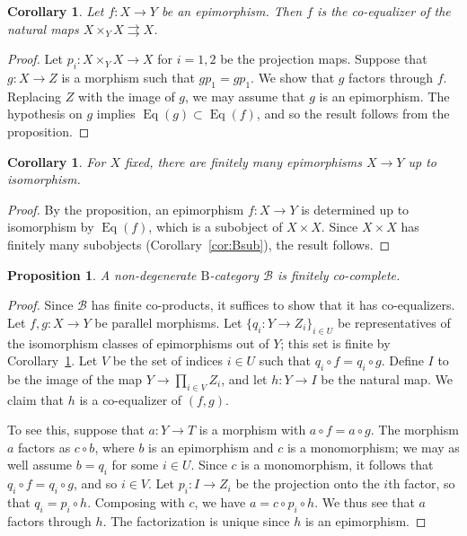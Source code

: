 \documentclass[12pt]{amsart}
\numberwithin{equation}{section}
\newtheorem{proposition}[equation]{Proposition}
\newtheorem{corollary}[equation]{Corollary}
\theoremstyle{definition}
\newcommand{\cB}{\mathcal{B}}
\newcommand{\rB}{\mathrm{B}}
\DeclareMathOperator{\Eq}{Eq}
\begin{document}
\begin{corollary} \label{cor:regular-epi}
Let $f \colon X \to Y$ be an epimorphism. Then $f$ is the co-equalizer of the natural maps $X \times_Y X \rightrightarrows X$.
\end{corollary}

\begin{proof}
Let $p_i \colon X \times_Y X \to X$ for $i=1,2$ be the projection maps. Suppose that $g \colon X \to Z$ is a morphism such that $gp_1=gp_1$. We show that $g$ factors through $f$. Replacing $Z$ with the image of $g$, we may assume that $g$ is an epimorphism. The hypothesis on $g$ implies $\Eq(g) \subset \Eq(f)$, and so the result follows from the proposition.
\end{proof}

\begin{corollary} \label{cor:finite-quot}
For $X$ fixed, there are finitely many epimorphisms $X \to Y$ up to isomorphism.
\end{corollary}

\begin{proof}
By the proposition, an epimorphism $f \colon X \to Y$ is determined up to isomorphism by $\Eq(f)$, which is a subobject of $X \times X$. Since $X \times X$ has finitely many subobjects (Corollary~\ref{cor:Bsub}), the result follows.
\end{proof}

\begin{proposition} \label{prop:B-co-compl}
A non-degenerate $\rB$-category $\cB$ is finitely co-complete.
\end{proposition}

\begin{proof}
Since $\cB$ has finite co-products, it suffices to show that it has co-equalizers. Let $f,g \colon X \to Y$ be parallel morphisms. Let $\{ q_i \colon Y \to Z_i \}_{i \in U}$ be representatives of the isomorphism classes of epimorphisms out of $Y$; this set is finite by Corollary~\ref{cor:finite-quot}. Let $V$ be the set of indices $i \in U$ such that $q_i \circ f = q_i \circ g$. Define $I$ to be the image of the map $Y \to \prod_{i \in V} Z_i$, and let $h \colon Y \to I$ be the natural map. We claim that $h$ is a co-equalizer of $(f,g)$.

To see this, suppose that $a \colon Y \to T$ is a morphism with $a \circ f = a \circ g$. The morphism $a$ factors as $c \circ b$, where $b$ is an epimorphism and $c$ is a monomorphism; we may as well assume $b=q_i$ for some $i \in U$. Since $c$ is a monomorphism, it follows that $q_i \circ f = q_i \circ g$, and so $i \in V$. Let $p_i \colon I \to Z_i$ be the projection onto the $i$th factor, so that $q_i=p_i \circ h$. Composing with $c$, we have $a=c \circ p_i \circ h$. We thus see that $a$ factors through $h$. The factorization is unique since $h$ is an epimorphism.
\end{proof}
\end{document}
